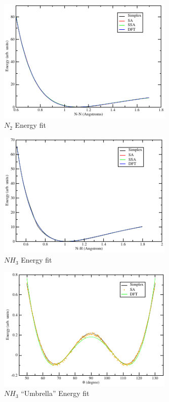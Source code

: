 \begin{figure}[!htb]
\begin{center}
\includegraphics[width=0.75\textwidth]{figures/n2}
\end{center}
\caption{$N_2$ Energy fit}
\label{fitn2}
\end{figure}
%
\begin{figure}[!htb]
\begin{center}
\includegraphics[width=0.75\textwidth]{figures/nh3}
\end{center}
\caption{$NH_3$ Energy fit}
\label{fitnh3}
\end{figure}
%
\begin{figure}
\begin{center}
\includegraphics[width=0.75\textwidth]{figures/nh3u}
\caption{$NH_3$ ``Umbrella'' Energy fit}
\label{fitnh3um}
\end{center}
\end{figure}
